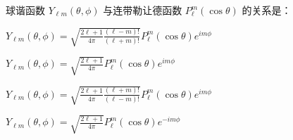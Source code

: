 \documentclass{njustexam}
\begin{document}
\begin{problem}
  球谐函数 $Y_{\ell m}(\theta, \phi)$ 与连带勒让德函数 $P_{\ell}^m(\cos \theta)$ 的关系是：
  \begin{abcd}
  \item $Y_{\ell m}(\theta, \phi) = \sqrt{\frac{2\ell+1}{4\pi} \frac{(\ell-m)!}{(\ell+m)!}} P_{\ell}^m(\cos \theta) e^{im\phi}$
  \item $Y_{\ell m}(\theta, \phi) = \sqrt{\frac{2\ell+1}{4\pi}} P_{\ell}^m(\cos \theta) e^{im\phi}$
  \item $Y_{\ell m}(\theta, \phi) = \sqrt{\frac{2\ell+1}{4\pi} \frac{(\ell+m)!}{(\ell-m)!}} P_{\ell}^m(\cos \theta) e^{im\phi}$
  \item $Y_{\ell m}(\theta, \phi) = \sqrt{\frac{2\ell+1}{4\pi}} P_{\ell}^m(\cos \theta) e^{-im\phi}$
  \end{abcd}
  \end{problem}
  
  

  
  
\end{document}
